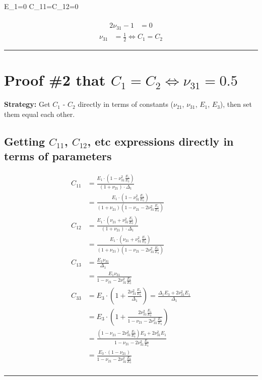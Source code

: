 \documentclass{article}
\begin{document}
 E_1=0   C_{11}=C_{12}=0 \\
 \\ 


\begin{align}
2 \nu_{31} -1 &= 0 
\end{align}
$$\boxed{
\begin{align}
\nu_{31} &= \frac{1}{2}  \iff C_1=C_2
\end{align} }$$

\noindent\rule{20cm}{0.8pt}

\newpage 
\section{Proof \#2 that $C_1\!=\!C_2 \iff \nu_{31}\!=\!0.5$}

\textbf{Strategy:} Get $C_1$ - $C_2$ directly in terms of constants ($\nu_{21}$, $\nu_{31}$, $E_1$, $E_3$), then set them equal each other.


\subsection{Getting $C_{11}$, $C_{12}$, etc expressions directly in terms of parameters}

\begin{align}
C_{11}
&=\frac{E_1 \cdot \left( 1-\nu_{31}^2 \frac{E_1}{E_3} \right)}{ \left(1+\nu_{21}\right) \cdot \Delta_1} \\
&=\frac{E_1 \cdot \left( 1-\nu_{31}^2 \frac{E_1}{E_3} \right)}{ \left(1+\nu_{21}\right) \left( 1-\nu_{21}-2\nu_{31}^2\frac{E_1}{E_3} \right) } \\
C_{12}
&=\frac{E_1 \cdot \left( \nu_{21}+\nu_{31}^2 \frac{E_1}{E_3} \right)}{ \left(1+\nu_{21}\right) \cdot \Delta_1} \\
&=\frac{E_1 \cdot \left( \nu_{21}+\nu_{31}^2 \frac{E_1}{E_3} \right)}{ \left(1+\nu_{21}\right)  \left( 1-\nu_{21}-2\nu_{31}^2\frac{E_1}{E_3} \right) } \\
C_{13}
&=\frac{E_1 \nu_{31}}{ \Delta_1} \\
&=\frac{E_1 \nu_{31}}{ 1-\nu_{21}-2\nu_{31}^2\frac{E_1}{E_3} } \\
C_{33}
&=E_3 \cdot \left( 1 + \frac{  2\nu_{31}^2 \frac{E_1}{E_3}}{\Delta_1} \right)
= \frac{ \Delta_1 E_3 + 2\nu_{31}^2 E_1}{\Delta_1} \\
&=E_3 \cdot \left( 1 + \frac{  2\nu_{31}^2 \frac{E_1}{E_3}}{ 1-\nu_{21}-2\nu_{31}^2\frac{E_1}{E_3} } \right) \\
&= \frac{ \left( 1-\nu_{21}-2\nu_{31}^2\frac{E_1}{E_3} \right) E_3 + 2 \nu_{31}^2 E_1}{ 1-\nu_{21}-2\nu_{31}^2\frac{E_1}{E_3} }  \\
&= \frac{ E_3 \cdot \left( 1-\nu_{21} \right) }{ 1-\nu_{21}-2\nu_{31}^2\frac{E_1}{E_3} }  \\
\end{align}
\noindent\rule{8cm}{0.4pt}
\end{document}
